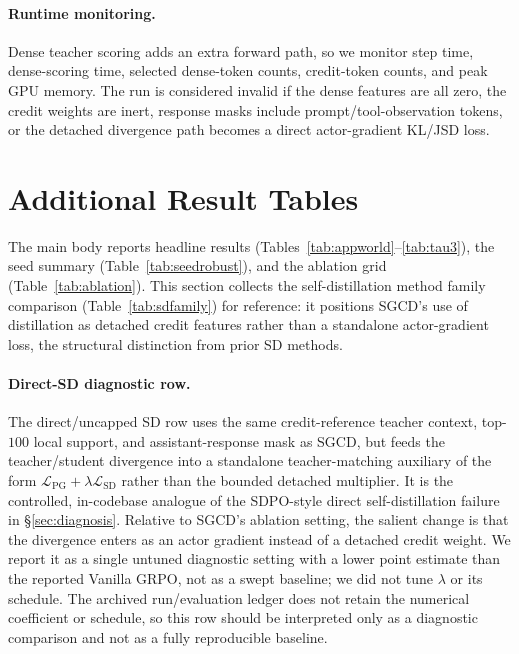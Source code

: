 \paragraph{Runtime monitoring.} Dense teacher scoring adds an extra forward
path, so we monitor step time, dense-scoring time, selected dense-token counts,
credit-token counts, and peak GPU memory. The run is considered invalid if the
dense features are all zero, the credit weights are inert, response masks include
prompt/tool-observation tokens, or the detached divergence path becomes a direct
actor-gradient KL/JSD loss.

\section{Additional Result Tables}
\label{sec:appendix_tables}

The main body reports headline results (Tables~\ref{tab:appworld}--\ref{tab:tau3}),
the seed summary (Table~\ref{tab:seedrobust}), and the ablation grid
(Table~\ref{tab:ablation}). This section collects the
self-distillation method family comparison (Table~\ref{tab:sdfamily}) for
reference: it positions SGCD's use of distillation as detached credit features
rather than a standalone actor-gradient loss, the structural distinction from
prior SD methods.

\paragraph{Direct-SD diagnostic row.} The direct/uncapped SD row uses the same
credit-reference teacher context, top-$100$ local support, and assistant-response
mask as SGCD, but feeds the teacher/student divergence into a standalone
teacher-matching auxiliary of the form
$\mathcal{L}_{\mathrm{PG}}+\lambda\mathcal{L}_{\mathrm{SD}}$
rather than the bounded detached multiplier. It is the controlled, in-codebase
analogue of the SDPO-style direct self-distillation failure in \S\ref{sec:diagnosis}.
Relative to SGCD's ablation setting, the salient change is that the divergence
enters as an actor gradient instead of a detached credit weight. We report it as
a single untuned diagnostic setting with a lower point estimate than the reported
Vanilla GRPO, not as a swept baseline; we did not tune $\lambda$ or its
schedule. The archived run/evaluation ledger does not retain the numerical
coefficient or schedule, so this row should be interpreted only as a diagnostic
comparison and not as a fully reproducible baseline.



